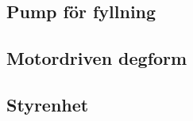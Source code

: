 \documentclass[11pt,a4paper,oneside]{book}
\begin{document}
\subsection{Pump för fyllning}
 
\newpage
\subsection{Motordriven degform}

\subsection{Styrenhet}

\end{document}
